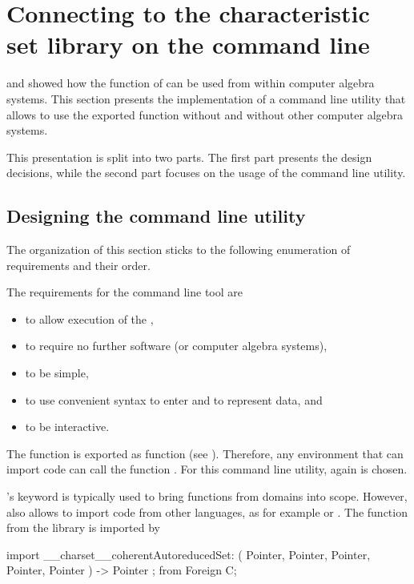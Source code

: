 \clearpage
\section{Connecting to the characteristic set library on the command line}

\newcommand\commandlinedesignpart[1]{}

  and  showed how the \exportedsymbol function of  can be used from within computer algebra systems. This section presents the implementation of a command line utility that allows to use the exported function without \Aldor and without other computer algebra systems.

This presentation is split into two parts. The first part presents the design decisions, while the second part focuses on the usage of the command line utility.

\subsection{Designing the command line utility}

The organization of this section sticks to the following enumeration of requirements and their order. 

The requirements for the command line tool are
\begin{itemize}
\item to allow execution of the \exportedsymbol,
\item to require no further software (\Aldor or computer algebra systems),
\item to be simple,
\item to use convenient syntax to enter and to represent data, and
\item to be interactive.
\end{itemize}

The \exportedsymbol function is exported as \C function (see ). Therefore, any environment that can import \C code can call the function \exportedsymbol. For this command line utility, again \Aldor is chosen.

\commandlinedesignpart{importing code}

\Aldor's keyword  is typically used to bring functions from \Aldor domains into scope. However,  also allows to import code from other languages, as for example \C or \Fortran. The function \exportedsymbol from the \LibCharSet library is imported by
\begin{adsnippet}
import { 
  __charset__coherentAutoreducedSet: ( Pointer, Pointer, Pointer, 
      Pointer, Pointer ) -> Pointer ;
} from Foreign C;
\end{adsnippet}

